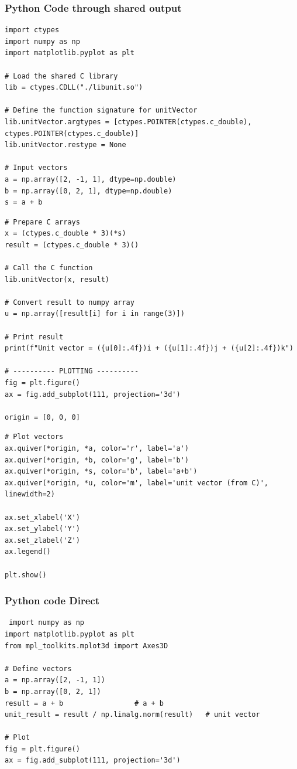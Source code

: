 \documentclass{beamer}
\begin{document}
            \begin{frame}[fragile]
	\frametitle{Python Code through shared output}
	\begin{lstlisting}
import ctypes
import numpy as np
import matplotlib.pyplot as plt

# Load the shared C library
lib = ctypes.CDLL("./libunit.so")

# Define the function signature for unitVector
lib.unitVector.argtypes = [ctypes.POINTER(ctypes.c_double), ctypes.POINTER(ctypes.c_double)]
lib.unitVector.restype = None

# Input vectors
a = np.array([2, -1, 1], dtype=np.double)
b = np.array([0, 2, 1], dtype=np.double)
s = a + b
\end{lstlisting}
            \end{frame}
            \begin{frame}[fragile]
	\begin{lstlisting}
# Prepare C arrays
x = (ctypes.c_double * 3)(*s)
result = (ctypes.c_double * 3)()

# Call the C function
lib.unitVector(x, result)

# Convert result to numpy array
u = np.array([result[i] for i in range(3)])

# Print result
print(f"Unit vector = ({u[0]:.4f})i + ({u[1]:.4f})j + ({u[2]:.4f})k")

# ---------- PLOTTING ----------
fig = plt.figure()
ax = fig.add_subplot(111, projection='3d')

origin = [0, 0, 0]
\end{lstlisting}
            \end{frame}
            \begin{frame}[fragile]
	\begin{lstlisting}
# Plot vectors
ax.quiver(*origin, *a, color='r', label='a')
ax.quiver(*origin, *b, color='g', label='b')
ax.quiver(*origin, *s, color='b', label='a+b')
ax.quiver(*origin, *u, color='m', label='unit vector (from C)', linewidth=2)

ax.set_xlabel('X')
ax.set_ylabel('Y')
ax.set_zlabel('Z')
ax.legend()

plt.show()
\end{lstlisting}
            \end{frame}
            
\begin{frame}[fragile]
\frametitle{Python code Direct}
\begin{lstlisting}
 import numpy as np
import matplotlib.pyplot as plt
from mpl_toolkits.mplot3d import Axes3D

# Define vectors
a = np.array([2, -1, 1])
b = np.array([0, 2, 1])
result = a + b                 # a + b
unit_result = result / np.linalg.norm(result)   # unit vector

# Plot
fig = plt.figure()
ax = fig.add_subplot(111, projection='3d')
\end{lstlisting}
            \end{frame}
            
\end{document}
